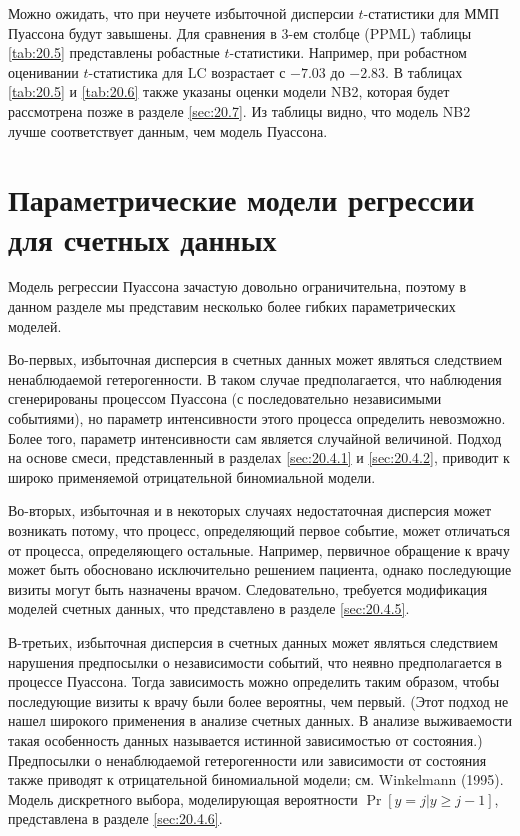 Можно ожидать, что при неучете избыточной дисперсии $t$-статистики для ММП Пуассона будут завышены. Для сравнения в 3-ем столбце (PPML) таблицы \ref{tab:20.5} представлены робастные $t$-статистики. Например, при робастном оценивании $t$-статистика для LC возрастает с $-7.03$ до $-2.83$. В таблицах \ref{tab:20.5} и \ref{tab:20.6} также указаны оценки модели NB2, которая будет рассмотрена позже в разделе \ref{sec:20.7}. Из таблицы видно, что модель NB2 лучше соответствует данным, чем модель Пуассона.




\section{Параметрические модели регрессии для счетных данных}\label{sec:20.4}

\noindent
Модель регрессии Пуассона зачастую довольно ограничительна, поэтому в данном разделе мы представим несколько более гибких параметрических моделей.

Во-первых, избыточная дисперсия в счетных данных может являться следствием ненаблюдаемой гетерогенности. В таком случае предполагается, что наблюдения сгенерированы процессом Пуассона (с последовательно независимыми событиями), но параметр интенсивности этого процесса определить невозможно. Более того, параметр интенсивности сам является случайной величиной. Подход на основе смеси, представленный в разделах \ref{sec:20.4.1} и \ref{sec:20.4.2}, приводит к широко применяемой отрицательной биномиальной модели.

Во-вторых, избыточная и в некоторых случаях недостаточная дисперсия может возникать потому, что процесс, определяющий первое событие, может отличаться от процесса, определяющего остальные. Например, первичное обращение к врачу может быть обосновано исключительно решением пациента, однако последующие визиты могут быть назначены врачом. Следовательно, требуется модификация моделей счетных данных, что представлено в разделе \ref{sec:20.4.5}.

В-третьих, избыточная дисперсия в счетных данных может являться следствием нарушения предпосылки о независимости событий, что неявно предполагается в процессе Пуассона. Тогда зависимость можно определить таким образом, чтобы последующие визиты к врачу были более вероятны, чем первый. (Этот подход не нашел широкого применения в анализе счетных данных. В анализе выживаемости такая особенность данных называется истинной зависимостью от состояния.) Предпосылки о ненаблюдаемой гетерогенности или зависимости от состояния также приводят к отрицательной биномиальной модели; см. Winkelmann (1995). Модель дискретного выбора, моделирующая вероятности $\Pr[y = j|y\ge j - 1]$, представлена в разделе \ref{sec:20.4.6}.

